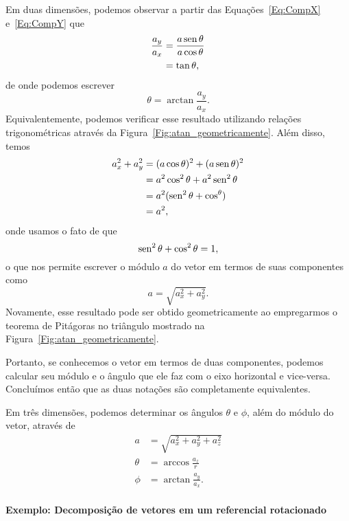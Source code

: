 Em duas dimensões, podemos observar a partir das Equações~\eqref{Eq:CompX} e~\eqref{Eq:CompY} que
\begin{align}
  \frac{a_y}{a_x} &=\frac{a\operatorname{sen}\theta}{a\cos\theta} \\
  &= \tan\theta,
\end{align}
%
de onde podemos escrever
\begin{equation}\label{Eq:AngaPartirDeComp}
  \theta = \arctan\frac{a_y}{a_x}.
\end{equation}
%
Equivalentemente, podemos verificar esse resultado utilizando relações trigonométricas através da  Figura~\ref{Fig:atan_geometricamente}.
%
Além disso, temos
\begin{align}
  a_ x^2 + a_y^2 &= (a\cos\theta) ^2 + (a\operatorname{sen}\theta)^2 \\
  &= a^2\cos^2\theta + a^2\operatorname{sen}^2\theta \\
  &= a^2(\operatorname{sen}^2\theta + \cos^\theta) \\
  &= a^2,
\end{align}
%
onde usamos o fato de que
\begin{equation}
    \operatorname{sen}^2\theta + \cos^2\theta = 1,
\end{equation}
%
o que nos permite escrever o módulo $a$ do vetor em termos de suas componentes como
\begin{equation}\label{Eq:ModAPartirDeComp}
    a = \sqrt{a_x^2 + a_y^2}.
\end{equation}
%
Novamente, esse resultado pode ser obtido geometricamente ao empregarmos o teorema de Pitágoras no triângulo mostrado na Figura~\ref{Fig:atan_geometricamente}.

Portanto, se conhecemos o vetor em termos de duas componentes, podemos calcular seu módulo e o ângulo que ele faz com o eixo horizontal e vice-versa. Concluímos então que as duas notações são completamente equivalentes.

Em três dimensões, podemos determinar os ângulos $\theta$ e $\phi$, além do módulo do vetor, através de
\begin{align}
    a &= \sqrt{a_x^2 + a_y^2 + a_z^2} \\
    \theta &= \arccos \frac{a_z}{r} \\
    \phi &= \arctan \frac{a_y}{a_x}.
\end{align}

\paragraph{Exemplo: Decomposição de vetores em um referencial rotacionado}

